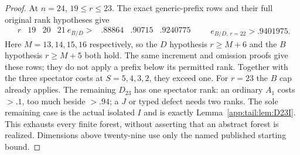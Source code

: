 \begin{proof}
At $n=24$, $19\le r\le23$. The exact generic-prefix rows and
their full original rank hypotheses give
\[
\begin{array}{c|c|c|c}
r&19&20&21\ \hline
e_{B/D}>&.88864&.90715&.9240775
\end{array}
\qquad e_{B/D,\,r=22}>.9401975.
\]
Here $M=13,14,15,16$ respectively, so the $D$ hypothesis
$r\ge M+6$ and the $B$ hypothesis $r\ge M+5$ both hold.
The same increment and omission proofs give these rows; they do
not apply a prefix below its permitted rank. Together with the
three spectator costs at $S=5,4,3,2$, they exceed one.
For $r=23$ the $B$ cap already applies. The remaining $D_{23}$
has one spectator rank: an ordinary $A_1$ costs $>.1$, too much
beside $>.94$; a $J$ or typed defect needs two ranks. The sole
remaining case is the actual isolated $I$ and is exactly
Lemma~\ref{app:tail:lem:D23I}. This exhausts every finite forest,
without asserting that an abstract forest is realized. Dimensions
above twenty-nine use only the named published starting bound.
\end{proof}

